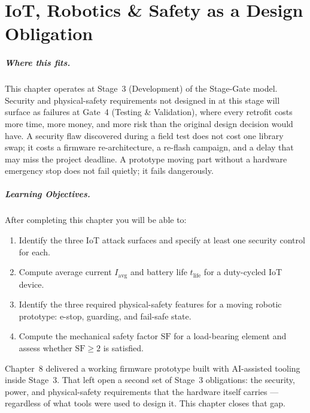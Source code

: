 \chapter{IoT, Robotics \& Safety as a Design Obligation}
\label{ch9}

\paragraph{Where this fits.}
This chapter operates at Stage~3 (Development) of the Stage-Gate model.
Security and physical-safety requirements not designed in at this stage will
surface as failures at Gate~4 (Testing \& Validation), where every retrofit
costs more time, more money, and more risk than the original design decision
would have.
A security flaw discovered during a field test does not cost one library swap;
it costs a firmware re-architecture, a re-flash campaign, and a delay that may
miss the project deadline.
A prototype moving part without a hardware emergency stop does not fail quietly;
it fails dangerously.

\paragraph{Learning Objectives.}
After completing this chapter you will be able to:
\begin{enumerate}
  \item Identify the three IoT attack surfaces and specify at least one security
        control for each.
  \item Compute average current $I_{\text{avg}}$ and battery life $t_{\text{life}}$
        for a duty-cycled IoT device.
  \item Identify the three required physical-safety features for a moving robotic
        prototype: e-stop, guarding, and fail-safe state.
  \item Compute the mechanical safety factor $\mathrm{SF}$ for a load-bearing
        element and assess whether $\mathrm{SF} \geq 2$ is satisfied.
\end{enumerate}

Chapter~8 delivered a working firmware prototype built with AI-assisted tooling
inside Stage~3.
That left open a second set of Stage~3 obligations: the security, power, and
physical-safety requirements that the hardware itself carries --- regardless of
what tools were used to design it.
This chapter closes that gap.


